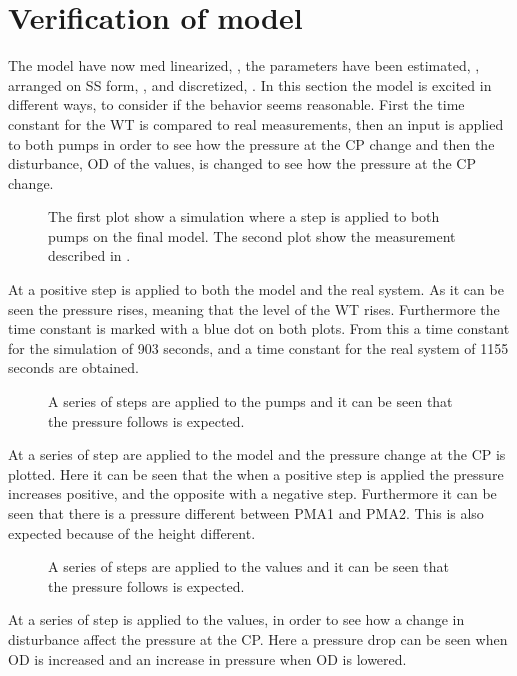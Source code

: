 \section{Verification of model}
\label{verification_of_model}

The model have now med linearized, , the parameters have been estimated, , arranged on SS form, , and discretized, . In this section the model is excited in different ways, to consider if the behavior  seems reasonable. First the time constant for the WT is compared to real measurements, then an input is applied to both pumps in order to see how the pressure at the CP change and then the disturbance, OD of the values, is changed to see how the pressure at the CP change. 

\begin{figure}[H]
   \centering
    
    \caption{The first plot show a simulation where a step is applied to both pumps on the final model. The second plot show the measurement described in .}
    \label{simulation_time_constant}
\end{figure}

At  a positive step is applied to both the model and the real system. As it can be seen the pressure rises, meaning that the level of the WT rises. Furthermore the time constant is marked with a blue dot on both plots. From this a time constant for the simulation of 903 seconds, and a time constant for the real system of 1155 seconds are obtained. 

\begin{figure}[H]
   \centering
    
    \caption{A series of steps are applied to the pumps and it can be seen that the pressure follows is expected.}
    \label{input_simulation}
\end{figure}

At  a series of step are applied to the model and the pressure change at the CP is plotted. Here it can be seen that the when a positive step is applied the pressure increases positive, and the opposite with a negative step. Furthermore it can be seen that there is a pressure different between PMA1 and PMA2. This is also expected because of the height different.  

\begin{figure}[H]
   \centering
    
    \caption{A series of steps are applied to the values and it can be seen that the pressure follows is expected.}
    \label{disturbance_simulation}
\end{figure}

At  a series of step is applied to the values, in order to see how a change in disturbance affect the pressure at the CP. Here a pressure drop can be seen when OD is increased and an increase in pressure when OD is lowered. 